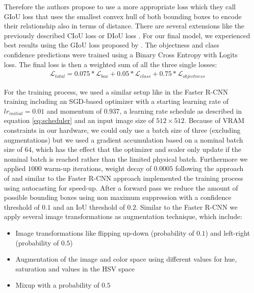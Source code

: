 Therefore the authors propose to use a more appropriate loss which they call \ac{GIoU} loss that uses the smallest convex hull of both bounding boxes to encode their relationship also in terms of distance. There are several extensions like the previously described \ac{CIoU} loss \autocite{zheng_enhancing_2021} or \ac{DIoU} loss \autocite{DIoU}. For our final model, we experienced best results using the \ac{GIoU} loss proposed by \citeauthor{giou}.
The objectness and class confidence predictions were trained using a Binary Cross Entropy with Logits loss. The final loss is then a weighted sum of all the three single losses:
\begin{align}
	\mathcal{L}_{total} = 0.075 * \mathcal{L}_{box} + 0.05 * \mathcal{L}_{class} + 0.75* \mathcal{L}_{objectness}
\end{align} 

For the training process, we used a similar setup like in the Faster \ac{R-CNN} training including an \acs{SGD}-based optimizer with a starting learning rate of $lr_{initial} = 0.01$ and momentum of $0.937$, a learning rate schedule as described in equation \ref{eq:scheduler} and an input image size of $512 \times 512$. Because of VRAM constraints in our hardware, we could only use a batch size of three (excluding augmentations) but we used a gradient accumulation based on a nominal batch size of $64$, which has the effect that the optimizer and scaler only update if the nominal batch is reached rather than the limited physical batch.
Furthermore we applied $1000$ warm-up iterations, weight decay of $0.0005$ following the approach of \autocite{yolov5} and similar to the Faster \ac{R-CNN} approach implemented the training process using autocasting for speed-up. After a forward pass we reduce the amount of possible bounding boxes using non maximum suppression with a confidence threshold of $0.1$ and an \acs{IoU} threshold of $0.2$.
Similar to the Faster \ac{R-CNN} we apply several image transformations as augmentation technique, which include:
\begin{itemize}
	\item Image transformations like flipping up-down (probability of $0.1$) and left-right (probability of $0.5$)
	\item Augmentation of the image and color space using different values for hue, saturation and values in the HSV space
	\item Mixup \autocite{zhang2017mixup} with a probability of $0.5$
\end{itemize}


